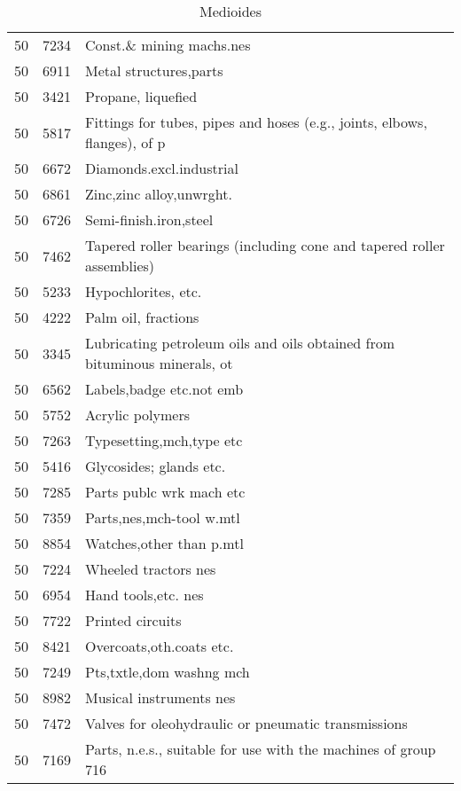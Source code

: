 \documentclass[class=article, crop=false]{standalone}
\begin{document}
\begin{table}[ht]
\begin{tabular}{lll}
		50 & 7234 & Const.\& mining machs.nes \\ 
		50 & 6911 & Metal structures,parts \\ 
		50 & 3421 & Propane, liquefied \\ 
		50 & 5817 & Fittings for tubes, pipes and hoses (e.g., joints, elbows, flanges), of p \\ 
		50 & 6672 & Diamonds.excl.industrial \\ 
		50 & 6861 & Zinc,zinc alloy,unwrght. \\ 
		50 & 6726 & Semi-finish.iron,steel \\ 
		50 & 7462 & Tapered roller bearings (including cone and tapered roller assemblies) \\ 
		50 & 5233 & Hypochlorites, etc. \\ 
		50 & 4222 & Palm oil, fractions \\ 
		50 & 3345 & Lubricating petroleum oils and oils obtained from bituminous minerals, ot \\ 
		50 & 6562 & Labels,badge etc.not emb \\ 
		50 & 5752 & Acrylic polymers \\ 
		50 & 7263 & Typesetting,mch,type etc \\ 
		50 & 5416 & Glycosides; glands etc. \\ 
		50 & 7285 & Parts publc wrk mach etc \\ 
		50 & 7359 & Parts,nes,mch-tool w.mtl \\ 
		50 & 8854 & Watches,other than p.mtl \\ 
		50 & 7224 & Wheeled tractors nes \\ 
		50 & 6954 & Hand tools,etc. nes \\ 
		50 & 7722 & Printed circuits \\ 
		50 & 8421 & Overcoats,oth.coats etc. \\ 
		50 & 7249 & Pts,txtle,dom washng mch \\ 
		50 & 8982 & Musical instruments nes \\ 
		50 & 7472 & Valves for oleohydraulic or pneumatic transmissions \\ 
		50 & 7169 & Parts, n.e.s., suitable for use with the machines of group 716 \\ 
		\hline
	\end{tabular}
	\caption{Medioides} 
	\label{table:pam}
\end{table}
\end{document}
